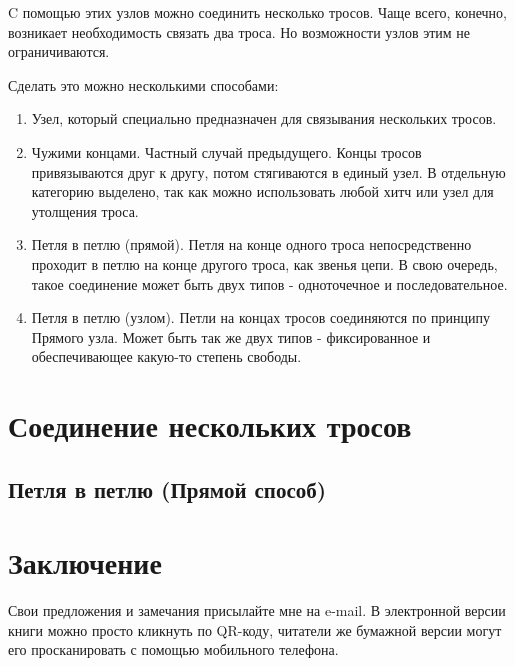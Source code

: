 \documentclass{book}
\begin{document}
\lettrine[lines=3,loversize=0.2,nindent=4pt,slope=0pt]{C}{} помощью этих узлов можно соединить несколько тросов. Чаще всего, конечно, возникает необходимость связать два троса. Но возможности узлов этим не ограничиваются.

Сделать это можно несколькими способами:

\begin{enumerate}
\item Узел, который специально предназначен для связывания нескольких тросов.
\item Чужими концами. Частный случай предыдущего. Концы тросов привязываются друг к другу, потом стягиваются в единый узел. В отдельную категорию выделено, так как можно использовать любой хитч или узел для утолщения троса. %
\item Петля в петлю (прямой). Петля на конце одного троса непосредственно проходит в петлю на конце другого троса, как звенья цепи. В свою очередь, такое соединение может быть двух типов - одноточечное и последовательное.
\item Петля в петлю (узлом). Петли на концах тросов соединяются по принципу Прямого узла. Может быть так же двух типов - фиксированное и обеспечивающее какую-то степень свободы.
\end{enumerate}

\chapter{Соединение нескольких тросов}

\section{Петля в петлю (Прямой способ)} %

% 




\chapter*{Заключение}

\begin{figure}
\vspace{-3ex}
\end{figure}

Свои предложения и замечания присылайте мне на e-mail. В электронной версии книги можно просто кликнуть по QR-коду, читатели же бумажной версии могут его просканировать с помощью мобильного телефона.
\end{document}
